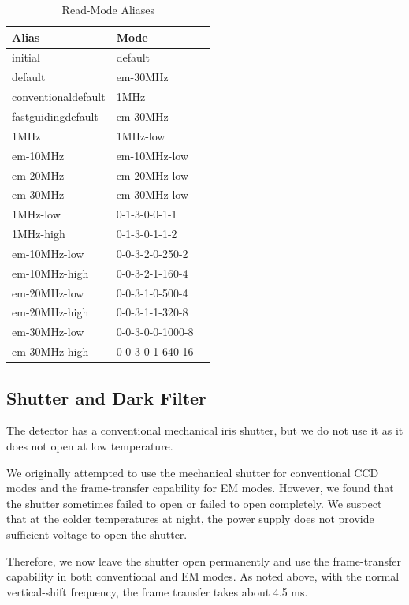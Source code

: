 \begin{table}
\caption{Read-Mode Aliases}
\label{table:read-mode-aliases}
\begin{center}
\begin{tabular}{lll}
\hline
Alias&Mode\\
\hline
 initial&default\\
 default&em-30MHz\\
 conventionaldefault&1MHz\\
 fastguidingdefault&em-30MHz\\
 1MHz&1MHz-low\\
 em-10MHz&em-10MHz-low\\
 em-20MHz&em-20MHz-low\\
 em-30MHz&em-30MHz-low\\
 1MHz-low&0-1-3-0-0-1-1\\
 1MHz-high&0-1-3-0-1-1-2\\
 em-10MHz-low&0-0-3-2-0-250-2\\
 em-10MHz-high&0-0-3-2-1-160-4\\
 em-20MHz-low&0-0-3-1-0-500-4\\
 em-20MHz-high&0-0-3-1-1-320-8\\
 em-30MHz-low&0-0-3-0-0-1000-8\\
 em-30MHz-high&0-0-3-0-1-640-16\\
 \hline
\end{tabular}
\end{center}
\end{table}

\subsection{Shutter and Dark Filter}

\label{section:shutter}

The detector has a conventional mechanical iris shutter, but we do not use it as it does not open at low temperature.

We originally attempted to use the mechanical shutter for conventional CCD modes and the frame-transfer capability for EM modes. However, we found that the shutter sometimes failed to open or failed to open completely. We suspect that at the colder temperatures at night, the power supply does not provide sufficient voltage to open the shutter. 

Therefore, we now leave the shutter open permanently and use the frame-transfer capability in both conventional and EM modes. As noted above, with the normal vertical-shift frequency, the frame transfer takes about 4.5 ms.

